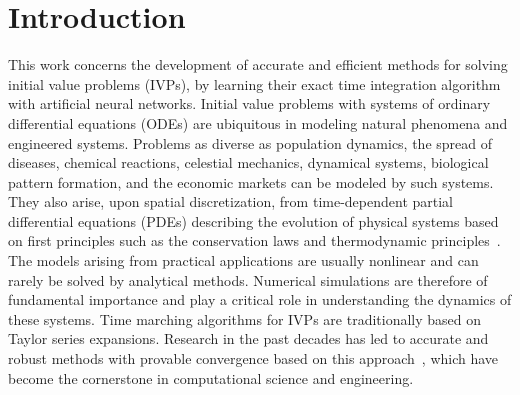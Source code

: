 \section{Introduction}
\label{sec_intro}


%
% 



This work concerns the development of accurate and efficient 
methods for solving initial value problems (IVPs), by learning
their exact time integration algorithm with artificial neural networks.
Initial value problems with systems of
ordinary differential equations (ODEs)
are ubiquitous in modeling natural phenomena and
engineered systems. Problems as diverse as population dynamics,
the spread of diseases, chemical reactions, celestial mechanics, dynamical systems,
biological pattern formation, and the economic markets
can be modeled by such systems. They also arise, upon spatial discretization,
from time-dependent partial differential equations (PDEs)
describing the evolution of physical systems
based on first principles such as the conservation laws and
thermodynamic principles~\cite{GrootM1984,GurtinFA2010,Dong2014,Dong2018,YangD2020}.
The models arising from practical applications are usually nonlinear and can rarely
be solved by analytical methods. Numerical simulations are therefore
of fundamental importance and play a critical role
in understanding the dynamics of these systems.
%
Time marching algorithms for IVPs are traditionally based on Taylor series
expansions.
Research in the past decades has led to
accurate and robust methods with provable convergence
based on this approach~\cite{CellierK2006,HairerNW1993,HairerW1996}, which have become
the cornerstone in computational science and engineering.

